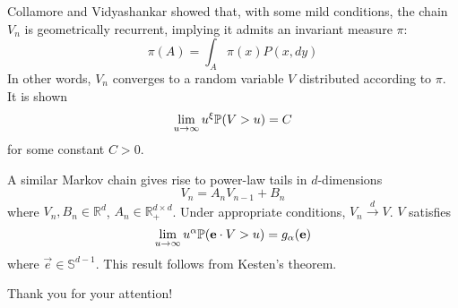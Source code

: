 \documentclass{beamer}
\begin{document}
\begin{frame}
  Collamore and Vidyashankar showed that,
  with some mild conditions, the chain $V_n$ is geometrically
  recurrent, implying it admits an invariant
  measure $\pi$:
  \[
  \pi(A) = \int_A \pi(x) P(x, dy)
  \]
  In other words, $V_n$ converges to a random variable $V$ distributed
  according to $\pi$. It is shown
  \[
   \lim_{u \to \infty} u^\xi \P(V > u) = C
  \]
  for some constant $C > 0$.
\end{frame}

\begin{frame}
  A similar Markov chain gives rise to power-law tails in $d$-dimensions
  \[
  V_n = A_n V_{n-1} + B_n
  \]
  where $V_n, B_n \in \mathbb R^d$,
  $A_n \in \mathbb R_+^{d \times d}$.
  Under appropriate conditions,
  $V_n \overset{d}{\to} V$. $V$ satisfies
  \[
  \lim_{u \to \infty} u^\alpha\P(\vec{e} \cdot V > u) = g_\alpha(\vec{e})
  \]
  where $\vec{e} \in \mathbb S^{d-1}$. This result follows from
  Kesten's theorem.
\end{frame}

\begin{frame}
  \centering
  Thank you for your attention!
\end{frame}


% 
\end{document}
